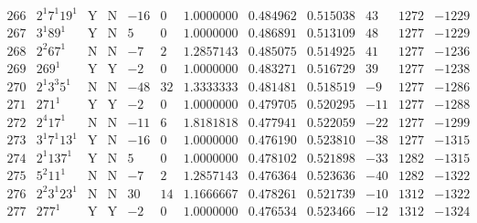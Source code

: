 \documentclass[11pt,reqno,a4letter]{article}
\numberwithin{figure}{section}
\numberwithin{table}{section}
\theoremstyle{plain}
\numberwithin{theorem}{section}
\theoremstyle{definition}
\begin{document}
\begin{table}[ht]
\begin{equation*}
{\begin{array}{cc|cc|ccc|cc|ccc}
 266 & 2^1 7^1 19^1 & \text{Y} & \text{N} & -16 & 0 & 1.0000000 & 0.484962 & 0.515038 & 43 & 1272 & -1229 \\
 267 & 3^1 89^1 & \text{Y} & \text{N} & 5 & 0 & 1.0000000 & 0.486891 & 0.513109 & 48 & 1277 & -1229 \\
 268 & 2^2 67^1 & \text{N} & \text{N} & -7 & 2 & 1.2857143 & 0.485075 & 0.514925 & 41 & 1277 & -1236 \\
 269 & 269^1 & \text{Y} & \text{Y} & -2 & 0 & 1.0000000 & 0.483271 & 0.516729 & 39 & 1277 & -1238 \\
 270 & 2^1 3^3 5^1 & \text{N} & \text{N} & -48 & 32 & 1.3333333 & 0.481481 & 0.518519 & -9 & 1277 & -1286 \\
 271 & 271^1 & \text{Y} & \text{Y} & -2 & 0 & 1.0000000 & 0.479705 & 0.520295 & -11 & 1277 & -1288 \\
 272 & 2^4 17^1 & \text{N} & \text{N} & -11 & 6 & 1.8181818 & 0.477941 & 0.522059 & -22 & 1277 & -1299 \\
 273 & 3^1 7^1 13^1 & \text{Y} & \text{N} & -16 & 0 & 1.0000000 & 0.476190 & 0.523810 & -38 & 1277 & -1315 \\
 274 & 2^1 137^1 & \text{Y} & \text{N} & 5 & 0 & 1.0000000 & 0.478102 & 0.521898 & -33 & 1282 & -1315 \\
 275 & 5^2 11^1 & \text{N} & \text{N} & -7 & 2 & 1.2857143 & 0.476364 & 0.523636 & -40 & 1282 & -1322 \\
 276 & 2^2 3^1 23^1 & \text{N} & \text{N} & 30 & 14 & 1.1666667 & 0.478261 & 0.521739 & -10 & 1312 & -1322 \\
 277 & 277^1 & \text{Y} & \text{Y} & -2 & 0 & 1.0000000 & 0.476534 & 0.523466 & -12 & 1312 & -1324 \\ 
\end{array}
}
\end{equation*}
\clearpage 

\end{table} 
\end{document}
